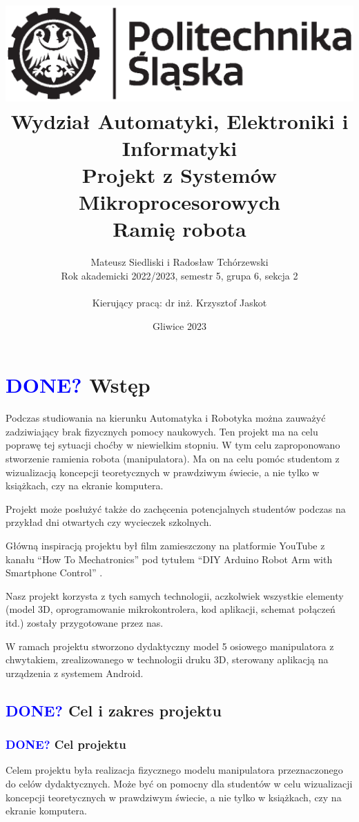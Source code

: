 \documentclass[11pt,titlepage,a4paper]{article}
\title{
\includegraphics[scale=0.75]{img/politechnika_sl_logo_bw_poziom_pl.eps}\\
\textbf{
Wydział Automatyki, Elektroniki i Informatyki}\\
\vspace*{1cm}
Projekt z Systemów Mikroprocesorowych\\
Ramię robota\\
}
\author{Mateusz Siedliski i Radosław Tchórzewski\\
Rok akademicki 2022/2023, semestr 5, grupa 6, sekcja 2\\
\\
Kierujący pracą: dr inż. Krzysztof Jaskot}
\date{Gliwice 2023}
\begin{document}
\onehalfspacing

\maketitle

\tableofcontents

\newpage

\section{\textcolor{blue}{DONE?} Wstęp}

Podczas studiowania na kierunku Automatyka i Robotyka można zauważyć zadziwiający brak fizycznych pomocy naukowych. Ten projekt ma na celu poprawę tej sytuacji choćby w niewielkim stopniu. W tym celu zaproponowano stworzenie ramienia robota (manipulatora). Ma on na celu pomóc studentom z wizualizacją koncepcji teoretycznych w prawdziwym świecie, a nie tylko w książkach, czy na ekranie komputera.

Projekt może posłużyć także do zachęcenia potencjalnych studentów podczas na przykład dni otwartych czy wycieczek szkolnych.

Główną inspiracją projektu był film zamieszczony na platformie YouTube z kanału \enquote{How To Mechatronics} pod tytułem \enquote{DIY Arduino Robot Arm with Smartphone Control} \cite*{HTM_YT}.

Nasz projekt korzysta z tych samych technologii, aczkolwiek wszystkie elementy (model 3D, oprogramowanie mikrokontrolera, kod aplikacji, schemat połączeń itd.) zostały przygotowane przez nas.

W ramach projektu stworzono dydaktyczny model 5 osiowego manipulatora z chwytakiem, zrealizowanego w technologii druku 3D, sterowany aplikacją na urządzenia z systemem Android.

\vspace*{2.5cm}

\subsection{\textcolor{blue}{DONE?} Cel i zakres projektu}

\subsubsection{\textcolor{blue}{DONE?} Cel projektu}

Celem projektu była realizacja fizycznego modelu manipulatora przeznaczonego do celów dydaktycznych. Może być on pomocny dla studentów w celu wizualizacji koncepcji teoretycznych w prawdziwym świecie, a nie tylko w książkach, czy na ekranie komputera.
\end{document}
